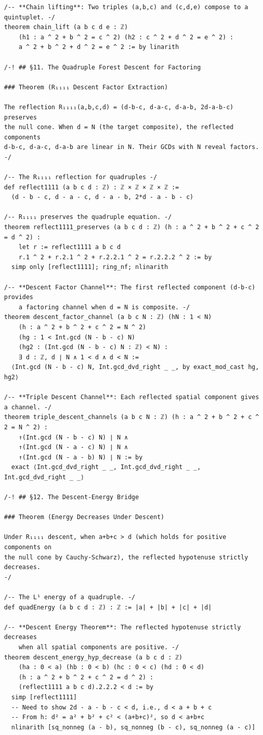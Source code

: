 \documentclass[11pt,openany]{book}
\theoremstyle{definition}
\theoremstyle{plain}
\theoremstyle{remark}
\begin{document}
\begin{lstlisting}[style=lean]
/-- **Chain lifting**: Two triples (a,b,c) and (c,d,e) compose to a quintuplet. -/
theorem chain_lift (a b c d e : ℤ)
    (h1 : a ^ 2 + b ^ 2 = c ^ 2) (h2 : c ^ 2 + d ^ 2 = e ^ 2) :
    a ^ 2 + b ^ 2 + d ^ 2 = e ^ 2 := by linarith

/-! ## §11. The Quadruple Forest Descent for Factoring

### Theorem (R₁₁₁₁ Descent Factor Extraction)

The reflection R₁₁₁₁(a,b,c,d) = (d-b-c, d-a-c, d-a-b, 2d-a-b-c) preserves
the null cone. When d = N (the target composite), the reflected components
d-b-c, d-a-c, d-a-b are linear in N. Their GCDs with N reveal factors.
-/

/-- The R₁₁₁₁ reflection for quadruples -/
def reflect1111 (a b c d : ℤ) : ℤ × ℤ × ℤ × ℤ :=
  (d - b - c, d - a - c, d - a - b, 2*d - a - b - c)

/-- R₁₁₁₁ preserves the quadruple equation. -/
theorem reflect1111_preserves (a b c d : ℤ) (h : a ^ 2 + b ^ 2 + c ^ 2 = d ^ 2) :
    let r := reflect1111 a b c d
    r.1 ^ 2 + r.2.1 ^ 2 + r.2.2.1 ^ 2 = r.2.2.2 ^ 2 := by
  simp only [reflect1111]; ring_nf; nlinarith

/-- **Descent Factor Channel**: The first reflected component (d-b-c) provides
    a factoring channel when d = N is composite. -/
theorem descent_factor_channel (a b c N : ℤ) (hN : 1 < N)
    (h : a ^ 2 + b ^ 2 + c ^ 2 = N ^ 2)
    (hg : 1 < Int.gcd (N - b - c) N)
    (hg2 : (Int.gcd (N - b - c) N : ℤ) < N) :
    ∃ d : ℤ, d ∣ N ∧ 1 < d ∧ d < N :=
  ⟨Int.gcd (N - b - c) N, Int.gcd_dvd_right _ _, by exact_mod_cast hg, hg2⟩

/-- **Triple Descent Channel**: Each reflected spatial component gives a channel. -/
theorem triple_descent_channels (a b c N : ℤ) (h : a ^ 2 + b ^ 2 + c ^ 2 = N ^ 2) :
    ↑(Int.gcd (N - b - c) N) ∣ N ∧
    ↑(Int.gcd (N - a - c) N) ∣ N ∧
    ↑(Int.gcd (N - a - b) N) ∣ N := by
  exact ⟨Int.gcd_dvd_right _ _, Int.gcd_dvd_right _ _, Int.gcd_dvd_right _ _⟩

/-! ## §12. The Descent-Energy Bridge

### Theorem (Energy Decreases Under Descent)

Under R₁₁₁₁ descent, when a+b+c > d (which holds for positive components on
the null cone by Cauchy-Schwarz), the reflected hypotenuse strictly decreases.
-/

/-- The L¹ energy of a quadruple. -/
def quadEnergy (a b c d : ℤ) : ℤ := |a| + |b| + |c| + |d|

/-- **Descent Energy Theorem**: The reflected hypotenuse strictly decreases
    when all spatial components are positive. -/
theorem descent_energy_hyp_decrease (a b c d : ℤ)
    (ha : 0 < a) (hb : 0 < b) (hc : 0 < c) (hd : 0 < d)
    (h : a ^ 2 + b ^ 2 + c ^ 2 = d ^ 2) :
    (reflect1111 a b c d).2.2.2 < d := by
  simp [reflect1111]
  -- Need to show 2d - a - b - c < d, i.e., d < a + b + c
  -- From h: d² = a² + b² + c² < (a+b+c)², so d < a+b+c
  nlinarith [sq_nonneg (a - b), sq_nonneg (b - c), sq_nonneg (a - c)]


\end{lstlisting}
\end{document}
